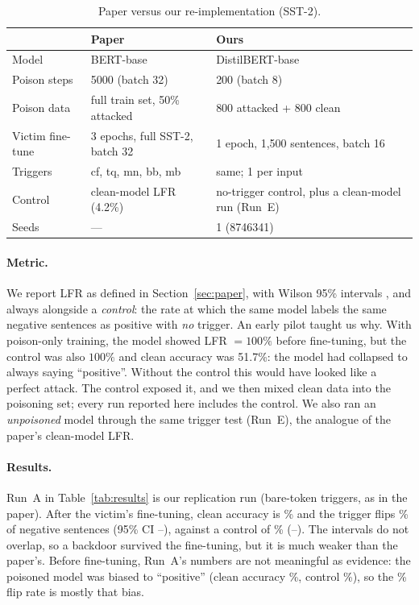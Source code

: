 \documentclass[11pt]{article}
\begin{document}
\begin{table}[t]
\centering\small
\begin{tabular}{p{1.3cm}p{2.15cm}p{2.45cm}}
\hline
 & \textbf{Paper} & \textbf{Ours}\\
\hline
Model & BERT-base & DistilBERT-base \citep{sanh2019}\\
Poison steps & 5000 (batch 32) & 200 (batch 8)\\
Poison data & full train set, 50\% attacked & 800 attacked + 800 clean\\
Victim fine-tune & 3 epochs, full SST-2, batch 32 & 1 epoch, 1,500 sentences, batch 16\\
Triggers & cf, tq, mn, bb, mb & same; 1 per input\\
Control & clean-model LFR (4.2\%) & no-trigger control, plus a clean-model run (Run~E)\\
Seeds & --- & 1 (8746341)\\
\hline
\end{tabular}
\caption{Paper versus our re-implementation (SST-2).}
\label{tab:settings}
\end{table}

\paragraph{Metric.}
We report LFR as defined in Section~\ref{sec:paper}, with Wilson 95\% intervals \citep{wilson1927}, and always alongside a \emph{control}: the rate at which the same model labels the same negative sentences as positive with \emph{no} trigger. An early pilot taught us why. With poison-only training, the model showed LFR $=100\%$ before fine-tuning, but the control was also $100\%$ and clean accuracy was 51.7\%: the model had collapsed to always saying ``positive''. Without the control this would have looked like a perfect attack. The control exposed it, and we then mixed clean data into the poisoning set; every run reported here includes the control. We also ran an \emph{unpoisoned} model through the same trigger test (Run~E), the analogue of the paper's clean-model LFR.

\paragraph{Results.}
Run~A in Table~\ref{tab:results} is our replication run (bare-token triggers, as in the paper). After the victim's fine-tuning, clean accuracy is \accAPost\% and the trigger flips \rAPostNaive\% of negative sentences (95\% CI \loAPostNaive--\hiAPostNaive), against a control of \rAPostCtl\% (\loAPostCtl--\hiAPostCtl). The intervals do not overlap, so a backdoor survived the fine-tuning, but it is much weaker than the paper's. Before fine-tuning, Run~A's numbers are not meaningful as evidence: the poisoned model was biased to ``positive'' (clean accuracy \accAPre\%, control \rAPreCtl\%), so the \rAPreNaive\% flip rate is mostly that bias.
\end{document}
